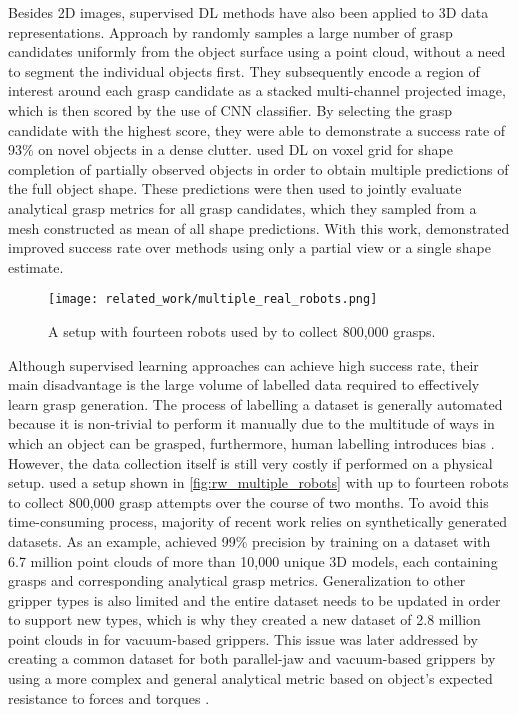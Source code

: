 Besides 2D images, supervised DL methods have also been applied to 3D data representations. Approach by \citet{ten_pas_grasp_2017} randomly samples a large number of grasp candidates uniformly from the object surface using a point cloud, without a need to segment the individual objects first. They subsequently encode a region of interest around each grasp candidate as a stacked multi-channel projected image, which is then scored by the use of CNN classifier. By selecting the grasp candidate with the highest score, they were able to demonstrate a success rate of 93\% on novel objects in a dense clutter. \citet{lundell_robust_2019} used DL on voxel grid for shape completion of partially observed objects in order to obtain multiple predictions of the full object shape. These predictions were then used to jointly evaluate analytical grasp metrics for all grasp candidates, which they sampled from a mesh constructed as mean of all shape predictions. With this work, \citeauthor{lundell_robust_2019} demonstrated improved success rate over methods using only a partial view or a single shape estimate.

\begin{figure}[b]
    \centering
    \texttt{[image: related\_work/multiple\_real\_robots.png]}
    \caption{A setup with fourteen robots used by \protect\citet{levine_learning_2016} to collect 800,000 grasps.}
    \label{fig:rw_multiple_robots}
\end{figure}

Although supervised learning approaches can achieve high success rate, their main disadvantage is the large volume of labelled data required to effectively learn grasp generation. The process of labelling a dataset is generally automated because it is non-trivial to perform it manually due to the multitude of ways in which an object can be grasped, furthermore, human labelling introduces bias \cite{pinto_supersizing_2015}. However, the data collection itself is still very costly if performed on a physical setup. \citet{levine_learning_2016} used a setup shown in \autoref{fig:rw_multiple_robots} with up to fourteen robots to collect 800,000 grasp attempts over the course of two months. To avoid this time-consuming process, majority of recent work relies on synthetically generated datasets. As an example, \citet{mahler_dex-net_2017} achieved 99\% precision by training on a dataset with 6.7 million point clouds of more than 10,000 unique 3D models, each containing grasps and corresponding analytical grasp metrics. Generalization to other gripper types is also limited and the entire dataset needs to be updated in order to support new types, which is why they created a new dataset of 2.8 million point clouds in \citeyear{mahler_dex-net_2018} for vacuum-based grippers. This issue was later addressed by creating a common dataset for both parallel-jaw and vacuum-based grippers by using a more complex and general analytical metric based on object's expected resistance to forces and torques \cite{mahler_learning_2019}.


